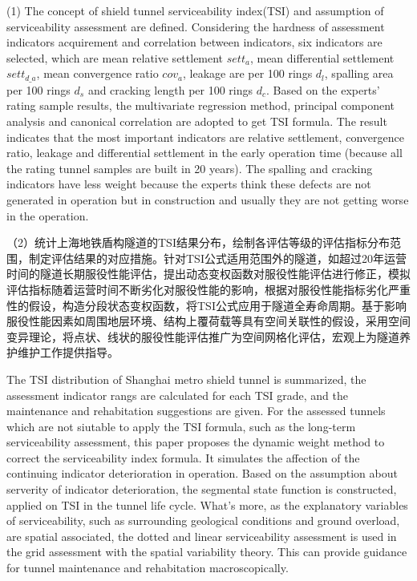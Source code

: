 \begin{cabstract}
(1) The concept of shield tunnel serviceability index(TSI) and assumption of serviceability assessment are defined. Considering the hardness of assessment indicators acquirement and correlation between indicators, six indicators are selected, which are mean relative settlement $sett_{a}$, mean differential settlement $sett_{d\_a}$, mean convergence ratio $cov_a$, leakage are per 100 rings $d_l$, spalling area per 100 rings $d_s$ and cracking length per 100 rings $d_c$. Based on the experts' rating sample results, the multivariate regression method, principal component analysis and canonical correlation are adopted to get TSI formula. The result indicates that the most important indicators are relative settlement, convergence ratio, leakage and differential settlement in the early operation time (because all the rating tunnel samples are built in 20 years). The spalling and cracking indicators have less weight because the experts think these defects are not generated in operation but in construction and usually they are not getting worse in the operation. 

（2）统计上海地铁盾构隧道的TSI结果分布，绘制各评估等级的评估指标分布范围，制定评估结果的对应措施。针对TSI公式适用范围外的隧道，如超过20年运营时间的隧道长期服役性能评估，提出动态变权函数对服役性能评估进行修正，模拟评估指标随着运营时间不断劣化对服役性能的影响，根据对服役性能指标劣化严重性的假设，构造分段状态变权函数，将TSI公式应用于隧道全寿命周期。基于影响服役性能因素如周围地层环境、结构上覆荷载等具有空间关联性的假设，采用空间变异理论，将点状、线状的服役性能评估推广为空间网格化评估，宏观上为隧道养护维护工作提供指导。

The TSI distribution of Shanghai metro shield tunnel is summarized, the assessment indicator rangs are calculated for each TSI grade, and the maintenance and rehabitation suggestions are given. For the assessed tunnels which are not siutable to apply the TSI formula, such as the long-term serviceability assessment, this paper proposes the dynamic weight method to correct the serviceability index formula. It simulates the affection of the continuing indicator deterioration in operation. Based on the assumption about serverity of indicator deterioration, the segmental state function is constructed, applied on TSI in the tunnel life cycle. What's more, as the explanatory variables of serviceability, such as surrounding geological conditions and ground overload, are spatial associated, the dotted and linear serviceability assessment is used in the grid assessment with the spatial variability theory. This can provide guidance for tunnel maintenance and rehabitation macroscopically.


\end{cabstract}

